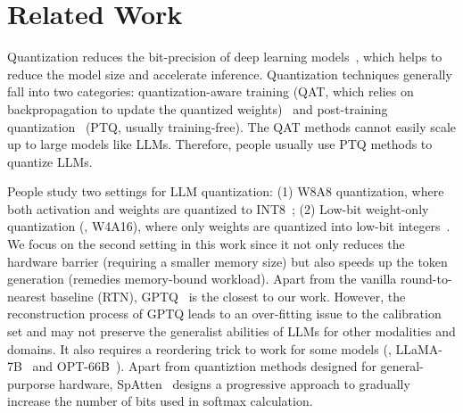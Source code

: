 

\section{Related Work}
Quantization reduces the bit-precision of deep learning models~\cite{han2016deep, jacob2018quantization, nagel2019data, wang2019haq, nagel2020up,lin2020mcunet}, which helps to reduce the model size and accelerate inference. Quantization techniques generally fall into two categories: quantization-aware training (QAT, which relies on backpropagation to update the quantized weights)~\cite{bengio2013estimating, gholami2021survey, nagel2021white, choi2018pact} and post-training quantization~\cite{jacob2018quantization, nagel2019data, nagel2020up} (PTQ, usually training-free). The QAT methods cannot easily scale up to large models like LLMs. Therefore, people usually use PTQ methods to quantize LLMs. 

 People study two settings for LLM quantization: (1) W8A8 quantization, where both activation and weights are quantized to INT8~\cite{dettmers2022llmint8, xiao2022smoothquant, zeroquant, outlier_suppression, wei2023outlier}; (2) Low-bit weight-only quantization (\eg, W4A16), where only weights are quantized into low-bit integers~\cite{frantar2022gptq, dettmers2022case, sheng2023high, park2022nuqmm}. We focus on the second setting in this work since it not only reduces the hardware barrier (requiring a smaller memory size) but also speeds up the token generation (remedies memory-bound workload). Apart from the vanilla round-to-nearest baseline (RTN), GPTQ~\cite{frantar2022gptq} is the closest to our work. However, the reconstruction process of GPTQ leads to an over-fitting issue to the calibration set and may not preserve the generalist abilities of LLMs for other modalities and domains. It also requires a reordering trick to work for some models (\eg, LLaMA-7B~\cite{touvron2023llama} and OPT-66B~\cite{opt}). Apart from quantiztion methods designed for general-purporse hardware, SpAtten~\cite{spatten} designs a progressive approach to gradually increase the number of bits used in softmax calculation.

